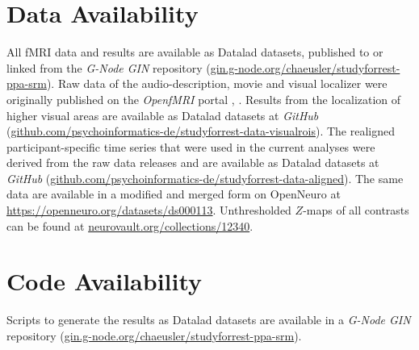 \normalsize



\section{Data Availability}



All fMRI data and results are available as Datalad \citep{halchenko2021datalad}
datasets, published to or linked from the \emph{G-Node GIN} repository
(\href{https://gin.g-node.org/chaeusler/studyforrest-ppa-srm}{\url{gin.g-node.org/chaeusler/studyforrest-ppa-srm}}).
Raw data of the audio-description, movie and visual localizer were originally
published on the \emph{OpenfMRI} portal
\citep[\url{https://legacy.openfmri.org/dataset/ds000113}][]
{Hanke2014ds000113}, \space
\citep[\url{https://legacy.openfmri.org/dataset/ds000113d}][]
{hanke2016ds000113d}.
Results from the localization of higher visual areas are available as Datalad
datasets at \emph{GitHub}
(\href{https://github.com/psychoinformatics-de/studyforrest-data-visualrois}{\url{github.com/psychoinformatics-de/studyforrest-data-visualrois}}).
The realigned participant-specific time series that were used in the current
analyses were derived from the raw data releases and are available as Datalad
datasets at \emph{GitHub}
(\href{https://github.com/psychoinformatics-de/studyforrest-data-aligned}{\url{github.com/psychoinformatics-de/studyforrest-data-aligned}}).
The same data are available in a modified and merged form on OpenNeuro at
\url{https://openneuro.org/datasets/ds000113}.
Unthresholded $Z$-maps of all contrasts can be found at
\href{https://identifiers.org/neurovault.collection:12340}{\url{neurovault.org/collections/12340}}.


\section*{Code Availability}

Scripts to generate the results as Datalad \citep{halchenko2021datalad} datasets
are available in a \emph{G-Node GIN} repository
(\href{https://gin.g-node.org/chaeusler/studyforrest-ppa-srm}{\url{gin.g-node.org/chaeusler/studyforrest-ppa-srm}}).


